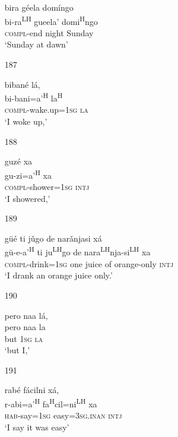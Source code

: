 \begin{itemize}
\glll  bira g\'{e}ela dom\'{i}ngo\\
 bi-ra\textsuperscript{LH} gueela' domi\textsuperscript{H}ngo \\
\textsc{compl}-end night Sunday\\
\glt `Sunday at dawn'
 


\item[187]
 
\glll biban\'{e} l\'{a},\\
bi-bani=a'\textsuperscript{H} la\textsuperscript{H}\\
\textsc{compl}-wake.up=\textsc{1sg} \textsc{la}\\
\glt `I woke up,' 



\item [188]

\glll guz\'{e} xa\\
gu-zi=a'\textsuperscript{H} xa\\
\textsc{compl}-shower=\textsc{1sg} \textsc{intj}\\
\glt `I showered,' 


\item [189]

\glll g\"{u}\'{e} ti j\v{u}go de nar\v{a}njasi x\'{a}\\
g\"{u}-e-a'\textsuperscript{H} ti ju\textsuperscript{LH}go de nara\textsuperscript{LH}nja-si\textsuperscript{LH} xa\\
\textsc{compl}-drink=\textsc{1sg} one juice of orange-only \textsc{intj}\\
\glt `I drank an orange juice only.'



\item[190]
 
\glll   pero naa l\'{a}, \\
 pero naa la\\
 but \textsc{1sg} \textsc{la}\\
\glt `but I,'
 


\item[191]
 
\glll   rab\'{e} f\'{a}cilni x\'{a}, \\
 r-abi=a'\textsuperscript{H} fa\textsuperscript{H}cil=ni\textsuperscript{LH} xa\\
\textsc{hab}-say=\textsc{1sg} easy=\textsc{3sg.inan} \textsc{intj}\\
\glt `I say it was easy'
 



\end{itemize}
